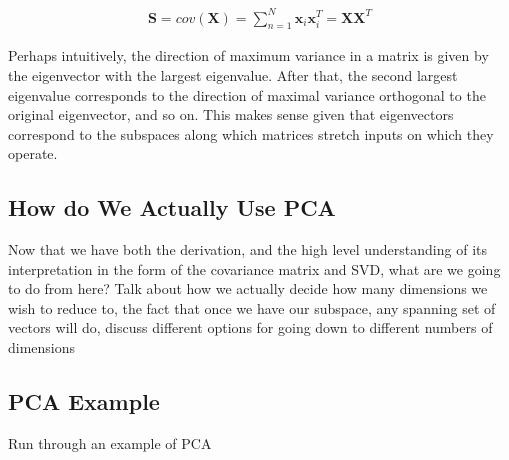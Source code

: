 \begin{align*}
	\textbf{S} = cov(\textbf{X}) = \sum_{n=1}^{N} \textbf{x}_{i} \textbf{x}_{i}^{T} = \textbf{X}\textbf{X}^{T}
\end{align*}


Perhaps intuitively, the direction of maximum variance in a matrix is given by the eigenvector with the largest eigenvalue. After that, the second largest eigenvalue corresponds to the direction of maximal variance orthogonal to the original eigenvector, and so on. This makes sense given that eigenvectors correspond to the subspaces along which matrices stretch inputs on which they operate.

\subsection{How do We Actually Use PCA}
Now that we have both the derivation, and the high level understanding of its interpretation in the form of the covariance matrix and SVD, what are we going to do from here? Talk about how we actually decide how many dimensions we wish to reduce to, the fact that once we have our subspace, any spanning set of vectors will do, discuss different options for going down to different numbers of dimensions

\subsection{PCA Example}
Run through an example of PCA
